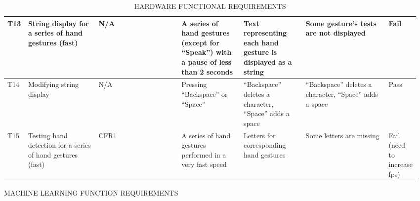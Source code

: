 \documentclass[12pt, titlepage]{article}
\begin{document}
\begin{landscape}
\begin{longtable}{p{0.05\linewidth}|p{0.17\linewidth}|p{0.2\linewidth}|p{0.15\linewidth}|p{0.15\linewidth}|p{0.2\linewidth}|p{0.05\linewidth}}
T13 & String display for a series of hand gestures (fast) & N/A & A series of hand gestures (except for “Speak”) with a pause of  less than 2 seconds & Text representing each hand gesture is displayed as a string & Some gesture’s tests are not displayed & Fail\\ \hline
T14 & Modifying string display & N/A & Pressing “Backspace” or “Space” & “Backspace” deletes a character, “Space” adds a space & “Backspace” deletes a character, “Space” adds a space & Pass\\
T15 & Testing hand detection for a series of hand gestures (fast) & CFR1 & A series of hand gestures performed in a very fast speed & Letters for corresponding hand gestures & Some letters are missing & Fail (need to increase fps)
\hline
\caption{HARDWARE FUNCTIONAL REQUIREMENTS}
\end{longtable}
\end{landscape}

\newpage
\centerline{MACHINE LEARNING FUNCTION REQUIREMENTS}
\end{document}
